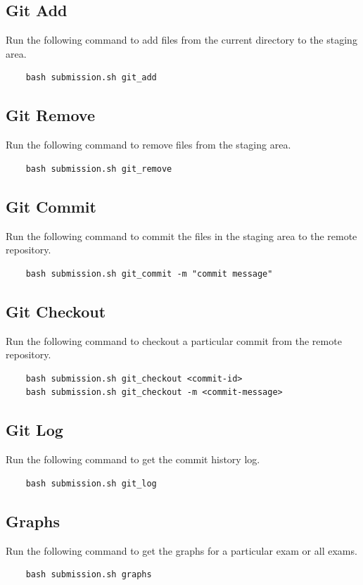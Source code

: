 \documentclass{article}
\begin{document}
\subsection{Git Add}
Run the following command to add files from the current directory to the staging area.
\begin{verbatim}
    bash submission.sh git_add
\end{verbatim}

\subsection{Git Remove}
Run the following command to remove files from the staging area.
\begin{verbatim}
    bash submission.sh git_remove
\end{verbatim}

\subsection{Git Commit}
Run the following command to commit the files in the staging area to the remote repository.
\begin{verbatim}
    bash submission.sh git_commit -m "commit message"
\end{verbatim}

\subsection{Git Checkout}
Run the following command to checkout a particular commit from the remote repository.
\begin{verbatim}
    bash submission.sh git_checkout <commit-id> 
    bash submission.sh git_checkout -m <commit-message>
\end{verbatim}
\newpage

\subsection{Git Log}
Run the following command to get the commit history log.
\begin{verbatim}
    bash submission.sh git_log
\end{verbatim}

\subsection{Graphs}
Run the following command to get the graphs for a particular exam or all exams.
\begin{verbatim}
    bash submission.sh graphs
\end{verbatim}
\end{document}
